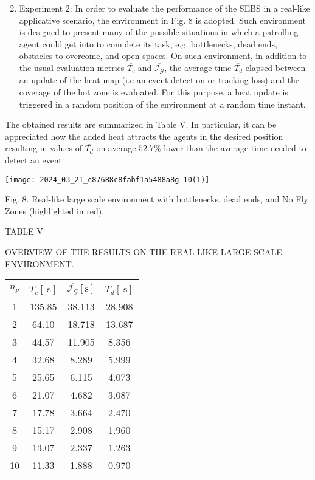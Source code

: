 \documentclass[conference]{IEEEtran}
\begin{document}
\begin{enumerate}
  \setcounter{enumi}{1}
  \item Experiment 2: In order to evaluate the performance of the SEBS in a real-like applicative scenario, the environment in Fig. 8 is adopted. Such environment is designed to present many of the possible situations in which a patrolling agent could get into to complete its task, e.g. bottlenecks, dead ends, obstacles to overcome, and open spaces. On such environment, in addition to the usual evaluation metrics $\overline{T_{c}}$ and $\overline{\mathcal{I}_{\mathcal{G}}}$, the average time $\overline{T_{d}}$ elapsed between an update of the heat map (i.e an event detection or tracking loss) and the coverage of the hot zone is evaluated. For this purpose, a heat update is triggered in a random position of the environment at a random time instant.
\end{enumerate}

The obtained results are summarized in Table V. In particular, it can be appreciated how the added heat attracts the agents in the desired position resulting in values of $\overline{T_{d}}$ on average $52.7 \%$ lower than the average time needed to detect an event

\begin{center}
\texttt{[image: 2024\_03\_21\_c87688c8fabf1a5488a8g-10(1)]}
\end{center}

Fig. 8. Real-like large scale environment with bottlenecks, dead ends, and No Fly Zones (highlighted in red).

TABLE V

OVERVIEW OF THE RESULTS ON THE REAL-LIKE LARGE SCALE ENVIRONMENT.

\begin{center}
\begin{tabular}{cccc}
\hline
$n_{p}$ & $\overline{T_{c}}[\mathrm{~s}]$ & $\overline{\mathcal{I}_{\mathcal{G}}}[\mathrm{s}]$ & $\overline{T_{d}}[\mathrm{~s}]$ \\
\hline
1 & 135.85 & 38.113 & 28.908 \\
2 & 64.10 & 18.718 & 13.687 \\
3 & 44.57 & 11.905 & 8.356 \\
4 & 32.68 & 8.289 & 5.999 \\
5 & 25.65 & 6.115 & 4.073 \\
6 & 21.07 & 4.682 & 3.087 \\
7 & 17.78 & 3.664 & 2.470 \\
8 & 15.17 & 2.908 & 1.960 \\
9 & 13.07 & 2.337 & 1.263 \\
10 & 11.33 & 1.888 & 0.970 \\
\end{tabular}
\end{center}
\end{document}
